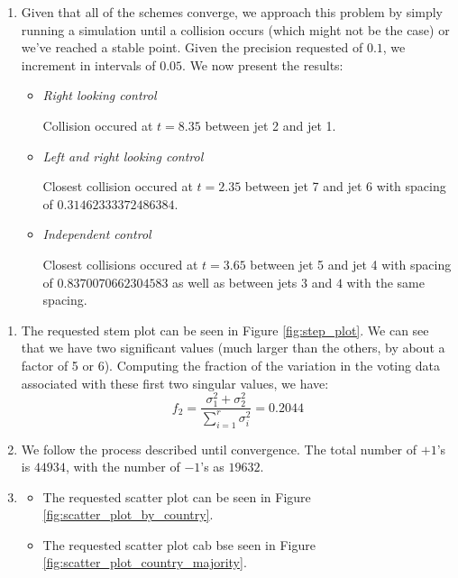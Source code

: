 \documentclass[12pt]{exam}
\newcommand{\Q}[1]{\question{\large{\textbf{#1}}}}
\begin{document}
\begin{questions}
\begin{solution}
\begin{enumerate}[label=(\alph*)]
      \item Given that all of the schemes converge, we approach this problem by simply running a simulation until a collision occurs (which might not be the case) or we've reached a stable point. Given the precision requested of $0.1$, we increment in intervals of $0.05$. We now present the results:
      \begin{itemize}
        \item \textit{Right looking control}
         
          Collision occured at $t = 8.35$ between jet 2 and jet 1.
        
        \item \textit{Left and right looking control}

          Closest collision occured at $t = 2.35$ between jet 7 and jet 6 with spacing of $0.31462333372486384$.

        \item \textit{Independent control}

          Closest collisions occured at $t = 3.65$ between jet 5 and jet 4 with spacing of $0.8370070662304583$ as well as between jets $3$ and $4$ with the same spacing.

      \end{itemize}
    \end{enumerate}
  \end{solution}

  \newpage
  \Q{UN General Assembly voting}
  \begin{solution}
    \begin{enumerate}[label=(\alph*)]
      \item The requested stem plot can be seen in Figure \ref{fig:step_plot}. We can see that we have two significant values (much larger than the others, by about a factor of 5 or 6). Computing the fraction of the variation in the voting data associated with these first two singular values, we have:
      \[
        f_2 = \frac{\sigma_1^2 + \sigma_2^2}{\sum_{i=1}^{r} \sigma_{i}^2} = 0.2044
      \]
      \item We follow the process described until convergence. The total number of $+1$'s is $44934$, with the number of $-1$'s as $19632$.
      \item
        \begin{itemize}
          \item The requested scatter plot can be seen in Figure \ref{fig:scatter_plot_by_country}.
          \item The requested scatter plot cab bse seen in Figure \ref{fig:scatter_plot_country_majority}.
        \end{itemize}


\end{enumerate}
\end{solution}
\end{questions}
\end{document}
